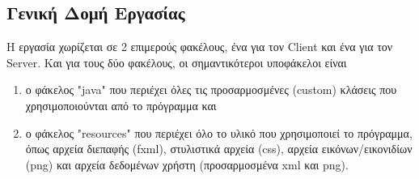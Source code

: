         \subsection{Γενική Δομή Εργασίας}
        \label{sec:SectionName1.3.1}
        Η εργασία χωρίζεται σε 2 επιμερούς φακέλους, ένα για τον Client και ένα για τον Server. Και για τους δύο φακέλους, οι σημαντικότεροι υποφάκελοι είναι 
        \begin{enumerate}
            \item ο φάκελος "java" που περιέχει όλες τις προσαρμοσμένες (custom) κλάσεις που χρησιμοποιούνται από το πρόγραμμα και
            
            \item ο φάκελος "resources" που περιέχει όλο το υλικό που χρησιμοποιεί το πρόγραμμα, όπως  αρχεία διεπαφής (fxml), στυλιστικά αρχεία (css), αρχεία εικόνων/εικονιδίων (png) και αρχεία δεδομένων χρήστη (προσαρμοσμένα xml και png).
        \end{enumerate}
        
